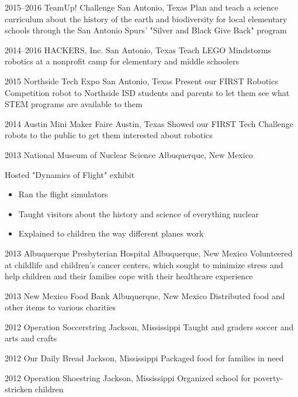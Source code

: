 \documentclass[]{friggeri-cv} %
\begin{document}
\begin{entrylist}

	\entry
	{2015--2016}
	{TeamUp! Challenge}
	{San Antonio, Texas}
	{Plan and teach a science curriculum about the history of the earth and biodiversity for local elementary schools through the San Antonio Spurs' "Silver and Black Give Back" program}


	\entry
	{2014--2016}
	{HACKERS, Inc.}
	{San Antonio, Texas}
	{Teach LEGO Mindstorms robotics at a nonprofit camp for elementary and middle schoolers}


	\entry
	{2015}
	{Northside Tech Expo}
	{San Antonio, Texas}
	{Present our FIRST Robotics Competition robot to Northside ISD students and parents to let them see what STEM programs are available to them}


	\entry
	{2014}
	{Austin Mini Maker Faire}
	{Austin, Texas}
	{Showed our FIRST Tech Challenge robots to the public to get them interested about robotics}


	\entry
	{2013}
	{National Museum of Nuclear Science}
	{Albuquerque, New Mexico}
	{Hosted "Dynamics of Flight" exhibit
		\begin{itemize}
			\item Ran the flight simulators
			\item Taught visitors about the history and science of everything nuclear
			\item Explained to children the way different planes work
		\end{itemize}
	}


	\entry
	{2013}
	{Albuquerque Presbyterian Hospital}
	{Albuquerque, New Mexico}
	{Volunteered at childlife and children's cancer centers, which sought to minimize stress and help children and their families cope with their healthcare experience}

	\entry
	{2013}
	{New Mexico Food Bank}
	{Albuquerque, New Mexico}
	{Distributed food and other items to various charities}


	\entry
	{2012}
	{Operation Soccerstring}
	{Jackson, Mississippi}
	{Taught  and  graders soccer and arts and crafts}


	\entry
	{2012}
	{Our Daily Bread}
	{Jackson, Mississippi}
	{Packaged food for families in need}


	\entry
	{2012}
	{Operation Shoestring}
	{Jackson, Mississippi}
	{Organized school for poverty-stricken children}

\end{entrylist}
\end{document}
